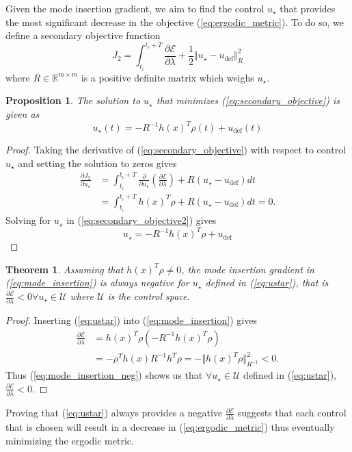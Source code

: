 \documentclass[conference]{IEEEtran}
\newtheorem{theorem}{Theorem}
\newtheorem{proposition}{Proposition}
\begin{document}
Given the mode insertion gradient, we aim to find the control $u_\star$ that provides the most significant decrease in the objective (\ref{eq:ergodic_metric}).
To do so, we define a secondary objective function 
\begin{equation}\label{eq:secondary_objective}
J_2 = \int_{t_i}^{t_i + T} \frac{\partial \mathcal{E}}{\partial \lambda} + \frac{1}{2}\Vert u_\star - u_\text{def} \Vert_R^2
\end{equation}
where $R \in \mathbb{R}^{m \times m}$ is a positive definite matrix which weighs $u_\star$.
\begin{proposition}
The solution to $u_\star$ that minimizes (\ref{eq:secondary_objective}) is given as
\begin{equation} \label{eq:ustar}
u_\star(t) = -R^{-1} h(x)^T \rho(t) + u_\text{def}(t)
\end{equation}
\end{proposition}
\begin{proof}
Taking the derivative of (\ref{eq:secondary_objective}) with respect to control $u_\star$ and setting the solution to zeros gives
\begin{align}\label{eq:secondary_objective2}
\frac{\partial J_2}{\partial u_\star} & = \int_{t_i}^{t_i + T} \frac{\partial }{\partial u_\star} \left( \frac{\partial \mathcal{E}}{\partial \lambda}\right) + R(u_\star - u_\text{def}) dt \nonumber \\
& = \int_{t_i}^{t_i + T}  h(x)^T\rho + R(u_\star - u_\text{def}) dt = 0.
\end{align}
Solving for $u_\star$ in (\ref{eq:secondary_objective2}) gives
\begin{equation}
u_\star = -R^{-1}h(x)^T\rho + u_\text{def}
\end{equation}
\end{proof}
\begin{theorem}
Assuming that $h(x)^T \rho \neq 0$, the mode insertion gradient in (\ref{eq:mode_insertion}) is always negative for $u_\star$ defined in (\ref{eq:ustar}), that is $\frac{\partial \mathcal{E}}{\partial \lambda} < 0 \forall u_\star \in \mathcal{U}$ where $\mathcal{U}$ is the control space.
\end{theorem}
\begin{proof}
Inserting (\ref{eq:ustar}) into (\ref{eq:mode_insertion}) gives
\begin{align}\label{eq:mode_insertion_neg}
\frac{\partial \mathcal{E}}{\partial \lambda} &= h(x)^T\rho \left(-R^{-1} h(x)^T\rho \right) \nonumber \\
& = -\rho^Th(x)R^{-1}h^T\rho = - \Vert h(x)^T\rho \Vert_{R^{-1}}^2 < 0.
\end{align}
Thus (\ref{eq:mode_insertion_neg}) shows us that $\forall u_\star \in \mathcal{U}$ defined in (\ref{eq:ustar}), $\frac{\partial \mathcal{E}}{\partial \lambda}<0$.
\end{proof}
Proving that (\ref{eq:ustar}) always provides a negative $\frac{\partial \mathcal{E}}{\partial \lambda}$ suggests that each control that is chosen will result in a decrease in (\ref{eq:ergodic_metric}) thus eventually minimizing the ergodic metric.
\end{document}
